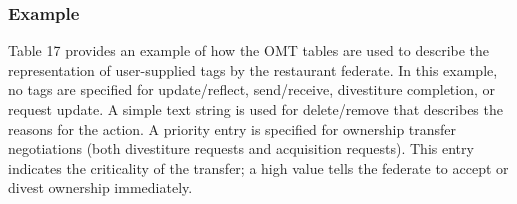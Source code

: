 \vspace{-7.5pt}

\subsubsection{Example}
Table 17 provides an example of how the OMT tables are used to describe the representation of user-supplied tags by the restaurant federate. In this example, no tags are specified for update/reflect, send/receive, divestiture completion, or request update. A simple text string is used for delete/remove that describes the reasons for the action. A priority entry is specified for ownership transfer negotiations (both divestiture requests and acquisition requests). This entry indicates the criticality of the transfer; a high value tells the federate to accept or divest ownership immediately.

